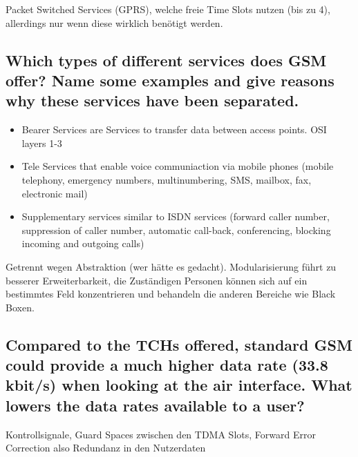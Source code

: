 Packet Switched Services (GPRS), welche freie Time Slots nutzen (bis zu 4), allerdings nur wenn diese wirklich benötigt werden.

\subsection{Which types of different services does GSM offer? Name some examples and give
reasons why these services have been separated.}
\begin{itemize}
\item Bearer Services are Services to transfer data between access points. OSI layers 1-3

\item Tele Services that enable voice communiaction via mobile phones (mobile telephony, emergency numbers, multinumbering, SMS, mailbox, fax, electronic mail)

\item Supplementary services similar to ISDN services (forward caller number, suppression of caller number, automatic call-back, conferencing, blocking incoming and outgoing calls)
\end{itemize}

Getrennt wegen Abstraktion (wer hätte es gedacht). Modularisierung führt zu besserer Erweiterbarkeit, die Zuständigen Personen können sich auf ein bestimmtes Feld konzentrieren und behandeln die anderen Bereiche wie Black Boxen.


\subsection{Compared to the TCHs offered, standard GSM could provide a much higher data rate
(33.8 kbit/s) when looking at the air interface. What lowers the data rates available to
a user?}
Kontrollsignale, Guard Spaces zwischen den TDMA Slots, Forward Error Correction also Redundanz in den Nutzerdaten

